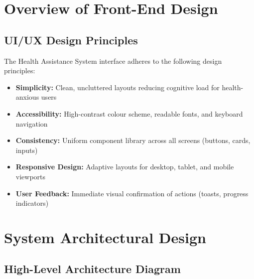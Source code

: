 \documentclass[12pt,a4paper]{report}
\begin{document}
\section{Overview of Front-End Design}

\subsection{UI/UX Design Principles}

The Health Assistance System interface adheres to the following design principles:

\begin{itemize}[leftmargin=1.5cm]
  \item \textbf{Simplicity:} Clean, uncluttered layouts reducing cognitive load for health-anxious users
  \item \textbf{Accessibility:} High-contrast colour scheme, readable fonts, and keyboard navigation
  \item \textbf{Consistency:} Uniform component library across all screens (buttons, cards, inputs)
  \item \textbf{Responsive Design:} Adaptive layouts for desktop, tablet, and mobile viewports
  \item \textbf{User Feedback:} Immediate visual confirmation of actions (toasts, progress indicators)
\end{itemize}

\section{System Architectural Design}

\subsection{High-Level Architecture Diagram}
\end{document}
